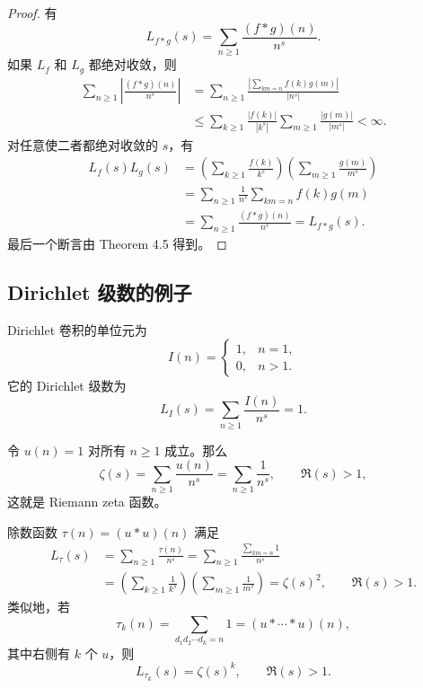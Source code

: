 \begin{proof}
	有
	\[
		L_{f*g}(s)=\sum_{n\geq 1}\frac{(f*g)(n)}{n^s}.
	\]
	如果 $L_f$ 和 $L_g$ 都绝对收敛，则
	\[
	\begin{aligned}
		\sum_{n\geq 1}\left|\frac{(f*g)(n)}{n^s}\right|
		&=
		\sum_{n\geq 1}
		\frac{\left|\sum_{km=n}f(k)g(m)\right|}{|n^s|}\\
		&\leq
		\sum_{k\geq 1}\frac{|f(k)|}{|k^s|}
		\sum_{m\geq 1}\frac{|g(m)|}{|m^s|}
		<\infty.
	\end{aligned}
	\]
	对任意使二者都绝对收敛的 $s$，有
	\[
	\begin{aligned}
		L_f(s)L_g(s)
		&=
		\left(\sum_{k\geq 1}\frac{f(k)}{k^s}\right)
		\left(\sum_{m\geq 1}\frac{g(m)}{m^s}\right)\\
		&=
		\sum_{n\geq 1}\frac1{n^s}\sum_{km=n}f(k)g(m)\\
		&=
		\sum_{n\geq 1}\frac{(f*g)(n)}{n^s}
		=
		L_{f*g}(s).
	\end{aligned}
	\]
	最后一个断言由 Theorem 4.5 得到。
\end{proof}

\subsection*{Dirichlet 级数的例子}

\begin{example}
	Dirichlet 卷积的单位元为
	\[
		I(n)=
		\begin{cases}
			1, & n=1,\\
			0, & n>1.
		\end{cases}
	\]
	它的 Dirichlet 级数为
	\[
		L_I(s)=\sum_{n\geq 1}\frac{I(n)}{n^s}=1.
	\]
\end{example}

\begin{example}
	令 $u(n)=1$ 对所有 $n\geq 1$ 成立。那么
	\[
		\zeta(s)=\sum_{n\geq 1}\frac{u(n)}{n^s}
		=
		\sum_{n\geq 1}\frac1{n^s},
		\qquad \Re(s)>1,
	\]
	这就是 Riemann zeta 函数。
\end{example}

\begin{example}
	除数函数 $\tau(n)=(u*u)(n)$ 满足
	\[
	\begin{aligned}
		L_\tau(s)
		&=
		\sum_{n\geq 1}\frac{\tau(n)}{n^s}
		=
		\sum_{n\geq 1}\frac{\sum_{km=n}1}{n^s}\\
		&=
		\left(\sum_{k\geq 1}\frac1{k^s}\right)
		\left(\sum_{m\geq 1}\frac1{m^s}\right)
		=
		\zeta(s)^2,
		\qquad \Re(s)>1.
	\end{aligned}
	\]
	类似地，若
	\[
		\tau_k(n)=\sum_{d_1d_2\cdots d_k=n}1=(u*\cdots*u)(n),
	\]
	其中右侧有 $k$ 个 $u$，则
	\[
		L_{\tau_k}(s)=\zeta(s)^k,
		\qquad \Re(s)>1.
	\]
\end{example}


